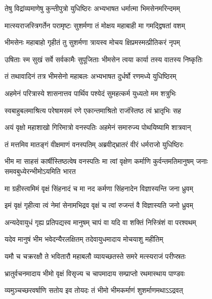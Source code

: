 \twolineshloka
{तेषु विद्रांव्यमाणेषु कुन्तीपुत्रो युधिष्ठिरः}
{अभ्यभाषत धर्मात्मा भिमसेनमरिन्दमम्}


\twolineshloka
{मात्स्यराजस्त्रिगर्तेन परामृष्टः सुशर्मणा}
{तं मोक्षय महाबाही मा गमद्द्विषतां वशम्}


\twolineshloka
{भीमसेनः महाबाहो गृहीतं तु सुशर्मणा}
{त्रायस्व मोचय क्षिप्रमस्मत्प्रीतिकरं नृपम्}


\twolineshloka
{उषिताः स्म सुखं सर्वे सर्वकामैः सुपूजिताः}
{भीमसेन त्वया कार्या तस्य वातस्य निष्कृतिः}



\twolineshloka
{तं तथावादिनं तत्र भीमसेनो महाबलः}
{अभ्यभाषत दुर्धर्षो रणमध्ये युधिष्ठिरम्}


\twolineshloka
{अहमेनं परित्रास्ये शासनात्तव पार्थिव}
{पश्येदं सुमहत्कर्म युध्यतो मम शत्रुभिः}


\twolineshloka
{स्वबाहुबलमाश्रित्य परेषामसमं रणे}
{एकान्तमाश्रितो राजंस्तिष्ठ त्वं भ्रातृभिः सह}


\twolineshloka
{अयं वृक्षो महाशाखो गिरिमात्रो वनस्पतिः}
{अहमेनं समारुज्य पोथयिष्यामि शात्रवान्}



\twolineshloka
{तं मत्तमिव मातङ्गं वीक्षमाणं वनस्पतिम्}
{अब्रवीद्भ्रातरं वीरं धर्मराजो युधिष्ठिरः}


\onelineshloka
{भीम मा साहसं कार्षीस्तिष्ठत्वेष वनस्पतिः}
\twolineshloka
{मा त्वां वृक्षेण कर्माणि कुर्वन्तमतिमानुषम्}
{जनाः समवबुध्येरन्भीमोऽयमिति भारत}


\twolineshloka
{मा ग्रहीस्त्वमिमं वृक्षं सिंहनादं च मा नद}
{कर्मणा सिंहनादेन विज्ञास्यन्ति जना ध्रुवम्}


\twolineshloka
{इमं वृक्षं गृहीत्वा त्वं नेमां सेनामभिद्रव}
{वृक्षं च त्वां रुजन्तं वै विज्ञास्यति जनो ध्रुवम्}


\twolineshloka
{अन्यदेवायुधं गृह्य प्रतिपद्यस्व मानुषम्}
{चापं वा यदि वा शक्तिं निस्त्रिंशं वा परश्वथम्}


\twolineshloka
{यदेव मानुषं भीम भवेदन्यैरलक्षितम्}
{तदेवायुधमादाय मोचयाशु महीतिम्}


\twolineshloka
{यमौ च चक्ररक्षौ ते भवितारौ महाबलौ}
{व्यायच्छतस्ते समरे मत्स्यराजं परीप्स्रतः}



\twolineshloka
{भ्रातुर्वचनमादाय भीमो वृक्षं विसृज्य च}
{चापमादाय सम्प्राप्तो रथमास्थाय पाण्डवः}


\twolineshloka
{व्यमुञ्चच्छरवर्षाणि सतोय इव तोयदः}
{तं भीमो भीमकर्माणं शुशर्माणमथाऽऽद्रवत्}


